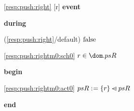 \noindent \ref{resp:push:right} [r] \textbf{event}
\begin{block}
  \item   \textbf{during}
  \begin{block}
  \item[ (\ref{resp:push:right}/default) ]\sout{$\text{false} $} %
  \end{block}
  \begin{block}
  \item[ \eqref{resp:push:rightm0:sch0} ]{$r \in \dom.psR $} %
  \end{block}
  \item   \textbf{begin}
  \begin{block}
  \item[ \eqref{resp:push:rightm0:act0} ]{$psR \mathrel{:\mkern1mu=} \{r\} \mathbin{\lhd\mkern-14mu-} psR $} %
  \end{block}
  \item   \textbf{end} \\
\end{block}
